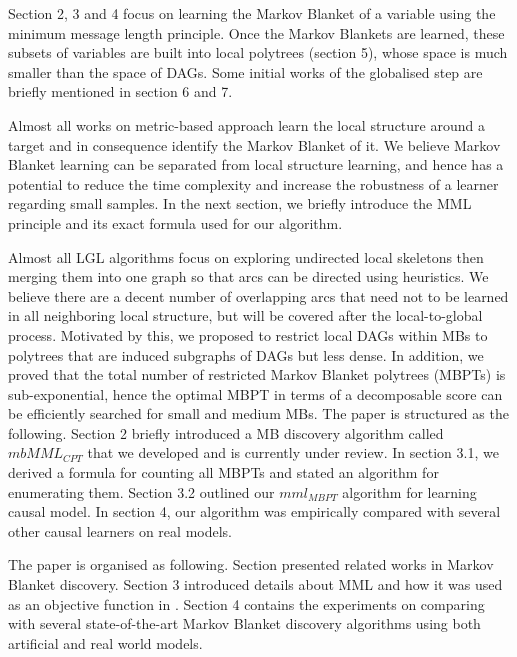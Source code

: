 \documentclass{svmult}
\begin{document}
Section 2, 3 and 4 focus on learning the Markov Blanket of a variable using the minimum message length principle. Once the Markov Blankets are learned, these subsets of variables are built into local polytrees (section 5), whose space is much smaller than the space of DAGs. Some initial works of the globalised step are briefly mentioned in section 6 and 7.  

Almost all works on metric-based approach learn the local structure around a target and in consequence identify the Markov Blanket of it. We believe Markov Blanket learning can be separated from local structure learning, and hence has a potential to reduce the time complexity and increase the robustness of a learner regarding small samples. In the next section, we briefly introduce the MML principle and its exact formula used for our \mmlcpt algorithm.

Almost all LGL algorithms focus on exploring undirected local skeletons then merging them into one graph so that arcs can be directed using heuristics. We believe there are a decent number of overlapping arcs that need not to be learned in all neighboring local structure, but will be covered after the local-to-global process. Motivated by this, we proposed to restrict local DAGs within MBs to polytrees that are induced subgraphs of DAGs but less dense. In addition, we proved that the total number of restricted Markov Blanket polytrees (MBPTs) is sub-exponential, hence the optimal MBPT in terms of a decomposable score can be efficiently searched for small and medium MBs. The paper is structured as the following. Section 2 briefly introduced a MB discovery algorithm called $mbMML_{CPT}$ that we developed and is currently under review.  In section 3.1, we derived a formula for counting all MBPTs and stated an algorithm for enumerating them. Section 3.2 outlined our $mml_{MBPT}$ algorithm for learning causal model. In section 4, our algorithm was empirically compared with several other causal learners on real models.  

The paper is organised as following. Section presented related works in Markov Blanket discovery. Section 3 introduced details about MML and how it was used as an objective function in \mmlcpt. Section 4 contains the experiments on comparing \mmlcpt with several state-of-the-art Markov Blanket discovery algorithms using both artificial and real world models. 
\end{document}
